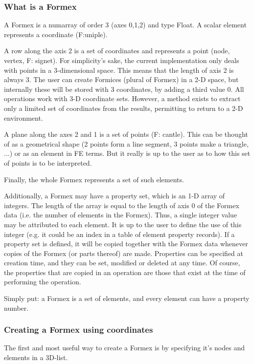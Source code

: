 \documentclass[a4paper]{manual}
\begin{document}
{\subsubsection{What is a Formex}
A Formex is a numarray of order 3 (axes 0,1,2) and type Float.
A scalar element represents a coordinate (F:uniple).

    A row along the axis 2 is a set of coordinates and represents a point
    (node, vertex, F: signet).
    For simplicity's sake, the current implementation only deals with points
    in a 3-dimensional space. This means that the length of axis 2 is always 3.
    The user can create Formices (plural of Formex) in a 2-D space, but
    internally these will be stored with 3 coordinates, by adding a third
    value 0. All operations work with 3-D coordinate sets. However, a method
    exists to extract only a limited set of coordinates from the results,
    permitting to return to a 2-D environment.

    A plane along the axes 2 and 1 is a set of points (F: cantle). This can be
    thought of as a geometrical shape (2 points form a line segment, 3 points
    make a triangle, ...) or as an element in FE terms. But it really is up to
    the user as to how this set of points is to be interpreted.

    Finally, the whole Formex represents a set of such elements.

    Additionally, a Formex may have a property set, which is an 1-D array of
    integers. The length of the array is equal to the length of axis 0 of the
    Formex data (i.e. the number of elements in the Formex). Thus, a single
    integer value may be attributed to each element. It is up to the user to
    define the use of this integer (e.g. it could be an index in a table of
    element property records).
    If a property set is defined, it will be copied together with the Formex
    data whenever copies of the Formex (or parts thereof) are made.
    Properties can be specified at creation time, and they can be set,
    modified or deleted at any time. Of course, the properties that are
    copied in an operation are those that exist at the time of performing
    the operation.   

Simply put: a Formex is a set of elements, and every element can have a property number.

\subsubsection{Creating a Formex using coordinates}
The first and most useful way to create a Formex is by specifying it's nodes and elements in a 3D-list.  

}
\end{document}
